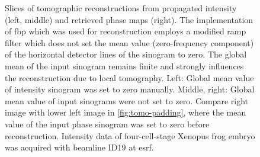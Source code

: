 \documentclass[
twoside,
openright,
titlepage,
numbers=noenddot,
headinclude,
fleqn,
a4paper,
footinclude=true,
cleardoublepage=empty,
abstractoff,
BCOR=5mm,
paper=a4,
fontsize=11pt,
british,ngerman,american,
]{scrreprt}
\begin{document}
\begin{figure} 
  \centering
  \small
  \caption[Tomographic reconstruction from propagated intensity and
  retrieved phase maps.]{Slices of tomographic reconstructions from
    propagated intensity (left, middle) and retrieved phase maps
    (right).  The implementation of \ac{fbp} which was used for
    reconstruction employs a modified ramp filter which does not set
    the mean value (zero-frequency component) of the horizontal
    detector lines of the sinogram to zero.  The global mean of the
    input sinogram remains finite and strongly influences the
    reconstruction due to local tomography.  Left: Global mean value
    of intensity sinogram was set to zero manually.  Middle, right:
    Global mean value of input sinograms were not set to zero.
    Compare right image with lower left image in
    \cref{fig:tomo-padding}, where the mean value of the input phase
    sinogram was set to zero before reconstruction.  Intensity data of
    four-cell-stage Xenopus frog embryo was acquired with beamline
    ID19 at \ac{esrf}.}
  \label{fig:tomo-ramp}
\end{figure}
\end{document}
